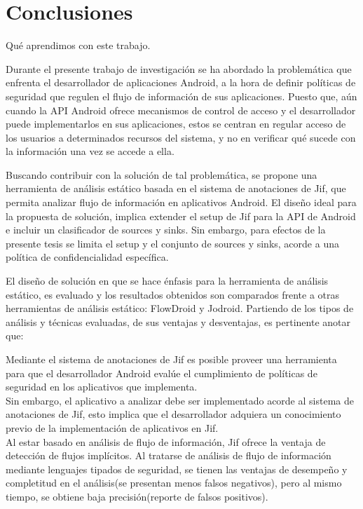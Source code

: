 \section{Conclusiones}
Qué aprendimos con este trabajo.\newline

Durante el presente trabajo de investigación se ha abordado la problemática que
enfrenta el desarrollador de aplicaciones Android, a la hora de definir políticas de
seguridad que regulen el flujo de información de sus aplicaciones. Puesto que,
aún cuando la API Android ofrece mecanismos de control de acceso y el
desarrollador puede implementarlos en sus aplicaciones, estos se centran en
regular acceso de los usuarios a determinados recursos del sistema, y no en
verificar qué sucede con la información una vez se accede a ella.

Buscando contribuir con la solución de tal problemática, se propone una
herramienta de análisis estático basada en el sistema de anotaciones de Jif, que
permita analizar flujo de información en aplicativos Android. El diseño ideal
para la propuesta de solución, implica extender el setup de Jif para la API de
Android e incluir un clasificador de sources y sinks. Sin embargo, para efectos
de la presente tesis se limita el setup y el conjunto de sources y sinks, acorde
a una política de confidencialidad específica.

El diseño de solución en que se hace énfasis para la herramienta de análisis
estático, es evaluado y los resultados obtenidos son comparados frente a otras
herramientas de análisis estático: FlowDroid y Jodroid. Partiendo de los tipos
de análisis y técnicas evaluadas, de sus ventajas y desventajas, es pertinente
anotar que:

Mediante el sistema de anotaciones de Jif es posible proveer una herramienta
para que el desarrollador Android evalúe el cumplimiento de políticas de
seguridad en los aplicativos que implementa.\\
Sin embargo, el aplicativo a analizar debe ser implementado acorde al sistema de
anotaciones de Jif, esto implica que el desarrollador adquiera un conocimiento
previo de la implementación de aplicativos en Jif.\\
Al estar basado en análisis de flujo de información, Jif ofrece la ventaja de
detección de flujos implícitos. 
Al tratarse de análisis de flujo de información mediante lenguajes tipados de
seguridad, se tienen las ventajas de desempeño y completitud en el análisis(se
presentan menos falsos negativos), pero al mismo tiempo, se obtiene baja
precisión(reporte de falsos positivos).

